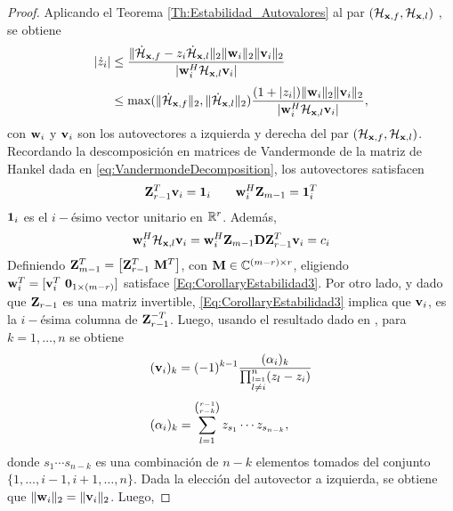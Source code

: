 		\begin{proof}
			Aplicando el Teorema \eqref{Th:Estabilidad_Autovalores} al par $(\mathcal{H}_{\mathbf{x},f},\mathcal{H}_{\mathbf{x},l})$ , se obtiene
			\begin{equation}
				\begin{aligned}
					|\dot{z}_i| & \le \frac{\|\dot{\mathcal{H}}_{\mathbf{x},f} - z_i\dot{\mathcal{H}}_{\mathbf{x},l}\|_2\|\mathbf{w}_i\|_2\|\mathbf{v}_i\|_2}{|\mathbf{w}_i^H\mathcal{H}_{\mathbf{x},l}\mathbf{v}_i|} \\[0.3em]
					& \le \max(\|\dot{\mathcal{H}}_{\mathbf{x},f}\|_2, \|\dot{\mathcal{H}}_{\mathbf{x},l}\|_2)\frac{(1+|z_i|)\|\mathbf{w}_i\|_2\|\mathbf{v}_i\|_2}{|\mathbf{w}_i^H\mathcal{H}_{\mathbf{x},l}\mathbf{v}_i|},
				\end{aligned}
				\label{Eq:CorollaryEstabilidad2}
			\end{equation}
			con $\mathbf{w}_i$ y $\mathbf{v}_i$ son los autovectores a izquierda y derecha del par $(\mathcal{H}_{\mathbf{x},f},\mathcal{H}_{\mathbf{x},l})$.
			Recordando la descomposición en matrices de Vandermonde de la matriz de Hankel dada en \eqref{eq:VandermondeDecomposition}, los autovectores satisfacen
			\begin{equation}
				\mathbf{Z}_{r-1}^T\mathbf{v}_i = \mathbf{1}_i\qquad \mathbf{w}_i^H\mathbf{Z}_{m-1} = \mathbf{1}_i^T
				\label{Eq:CorollaryEstabilidad3}
			\end{equation}
			$\mathbf{1}_i$ es el $i-$ésimo vector unitario en $\mathbb{R}^r$. Además,
			\begin{equation}
				\mathbf{w}_i^H\mathcal{H}_{\mathbf{x},l}\mathbf{v}_i = \mathbf{w}_i^H\mathbf{Z}_{m-1}\mathbf{D}\mathbf{Z}_{r-1}^T\mathbf{v}_i = c_i
				\label{Eq:CorollaryEstabilidad4}
			\end{equation}
			Definiendo $\matZ_{m-1}^T = \big[\matZ_{r-1}^T\ \matM^T\big]$, con $\mathbf{M}\in\mathbb{C}^{(m-r)\times r}$, eligiendo $\w_i^T = [\v_i^T\ \mathbf{0}_{1\times(m-r)}]$ satisface \eqref{Eq:CorollaryEstabilidad3}. Por otro lado, y dado que $\mathbf{Z}_{r-1}$ es una matriz invertible, \eqref{Eq:CorollaryEstabilidad3} implica que $\mathbf{v}_i$, es la $i-$ésima columna de $\mathbf{Z}_{r-1}^{-T}$. Luego, usando el resultado dado en \cite{Rawashdeh2018}, para $k=1,\ldots,n$ se obtiene
			\begin{equation}
				\begin{aligned}
					& (\mathbf{v}_i)_k = (-1)^{k-1}\frac{(\alpha_i)_k}{\prod_{\stackrel{l=1}{l\neq i}}^n(z_l-z_i)}\\[0.3em]
					& (\alpha_i)_k = \sum_{l=1}^{\binom{r-1}{r-k}}z_{s_1}\cdots z_{s_{n-k}},
				\end{aligned}
				\label{Eq:CorollaryEstabilidad5}
			\end{equation}
			donde $s_1\cdots s_{n-k}$ es una combinación de $n-k$ elementos tomados del conjunto $\{1,\ldots,i-1,i+1,\ldots,n\}.$ Dada la elección del autovector a izquierda, se obtiene que $\|\mathbf{w}_i\|_2=\|\mathbf{v}_i\|_2$. Luego,

\end{proof}
